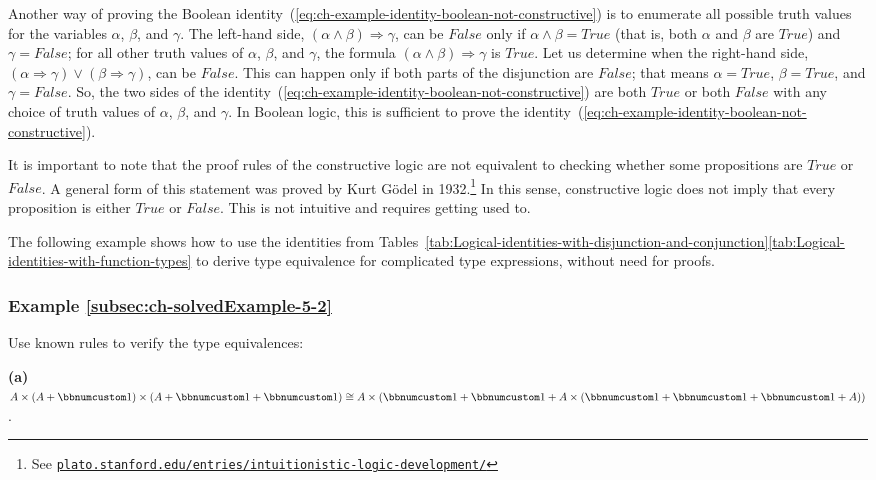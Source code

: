 Another way of proving the Boolean identity~(\ref{eq:ch-example-identity-boolean-not-constructive})
is to enumerate all possible truth values for the variables $\alpha$,
$\beta$, and $\gamma$. The left-hand side, $\left(\alpha\wedge\beta\right)\Rightarrow\gamma$,
can be $False$ only if $\alpha\wedge\beta=True$ (that is, both $\alpha$
and $\beta$ are $True$) and $\gamma=False$; for all other truth
values of $\alpha$, $\beta$, and $\gamma$, the formula $\left(\alpha\wedge\beta\right)\Rightarrow\gamma$
is $True$. Let us determine when the right-hand side, $(\alpha\Rightarrow\gamma)\vee(\beta\Rightarrow\gamma)$,
can be $False$. This can happen only if both parts of the disjunction
are $False$; that means $\alpha=True$, $\beta=True$, and $\gamma=False$.
So, the two sides of the identity~(\ref{eq:ch-example-identity-boolean-not-constructive})
are both $True$ or both $False$ with any choice of truth values
of $\alpha$, $\beta$, and $\gamma$. In Boolean logic, this is sufficient
to prove the identity~(\ref{eq:ch-example-identity-boolean-not-constructive}).

It is important to note that the proof rules of the constructive logic
are not equivalent to checking whether some propositions are $True$
or $False$. A general form of this statement was proved by Kurt G\"odel
in 1932.\footnote{See \texttt{\href{https://plato.stanford.edu/entries/intuitionistic-logic-development/\#SomeEarlResu}{plato.stanford.edu/entries/intuitionistic-logic-development/}}}
In this sense, constructive logic does not imply that every proposition
is either $True$ or $False$. This is not intuitive and requires
getting used to.

The following example shows how to use the identities from Tables~\ref{tab:Logical-identities-with-disjunction-and-conjunction}\textendash \ref{tab:Logical-identities-with-function-types}
to derive type equivalence for complicated type expressions, without
need for proofs.

\subsubsection{Example \label{subsec:ch-solvedExample-5-2}\ref{subsec:ch-solvedExample-5-2}}

Use known rules to verify the type equivalences:

\textbf{(a)} $A\times\left(A+\bbnum 1\right)\times\left(A+\bbnum 1+\bbnum 1\right)\cong A\times\left(\bbnum 1+\bbnum 1+A\times\left(\bbnum 1+\bbnum 1+\bbnum 1+A\right)\right)$.

